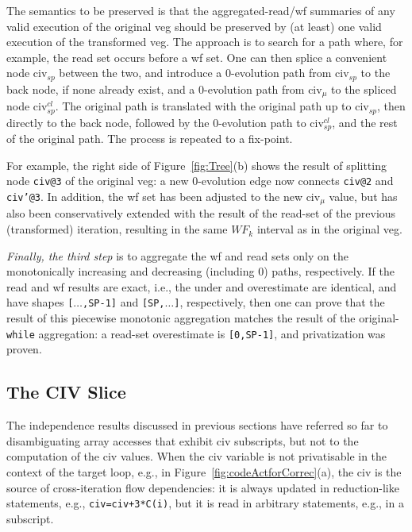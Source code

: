 \documentclass[10pt,nocopyrightspace]{sigplanconf}
\begin{document}
The semantics to be preserved is that the aggregated-read/{\sc wf} summaries of
any valid execution of the original {\sc veg} should be preserved by (at least) 
one valid execution of the transformed {\sc veg}.  The approach is
to search for a path where, for example,  the read set occurs before a {\sc wf} set.
One can then splice a convenient node {\sc civ}$_{sp}$ between the two, and 
introduce a $0$-evolution path from {\sc civ}$_{sp}$ to the back node, 
if none already exist,
and a $0$-evolution path from {\sc civ}$_\mu$ to the spliced node {\sc civ}$_{sp}^{cl}$.
The original path is translated with the original path up to {\sc civ}$_{sp}$,
then directly to the back node, followed by the $0$-evolution path to  
{\sc civ}$_{sp}^{cl}$, and the rest of the original path. The process is
repeated to a fix-point.

For example, the right side of Figure~\ref{fig:Tree}(b) shows the result of
splitting  node {\tt civ@3} of the original {\sc veg}: a new $0$-evolution
edge now connects {\tt civ@2} and {\tt civ'@3}. In addition, the {\sc wf} set 
has been adjusted to the new {\sc civ}$_\mu$ value, but has also
been conservatively extended with the result of the read-set of the previous
(transformed) iteration, resulting in the same $WF_k$ interval as 
in the original {\sc veg}. 



{\em Finally, the third step} is to aggregate the {\sc wf} and read sets 
only on the monotonically increasing and decreasing (including $0$) paths,
respectively. 
If the read and {\sc wf} results are exact, i.e., the under 
and overestimate are identical, and have shapes {\tt[$\ldots$,SP-1]}  
and {\tt[SP,$\ldots$]}, respectively, then 
one can prove that the result of this piecewise monotonic
aggregation matches the result of the original-{\tt while} aggregation:
a read-set overestimate is {\tt [0,SP-1]}, and privatization was proven.

\subsection{The CIV Slice}
\label{subsect:CivImplem}

The independence results discussed in previous sections have referred 
so far to disambiguating array accesses that exhibit {\sc civ} 
subscripts, but not to the computation of the {\sc civ} values.
%
When the {\sc civ} variable is not privatisable in the context of the 
target loop, e.g., in Figure~\ref{fig:codeActforCorrec}(a), 
the {\sc civ} is the source of cross-iteration flow dependencies: 
it is always updated in reduction-like statements, e.g., {\tt civ=civ+3*C(i)},
but it is read in arbitrary statements, e.g., in a subscript.
\end{document}
